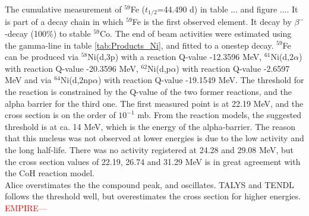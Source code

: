 \documentclass[a4paper,11pt,twoside]{book}
\begin{document}
\subsubsection{}
The cumulative measurement of $^{59}$Fe ($t_{1/2}$=44.490 d) \cite{Basunia2018} in table ... and figure .... It is part of a decay chain in which $^{59}$Fe is the first observed element. It decay by $\beta^-$-decay (100\%) to stable $^{59}$Co. The end of beam activities were estimated using the gamma-line in table \ref{tab:Products_Ni}, and fitted to a onestep decay. $^{59}$Fe can be produced via $^{58}$Ni(d,3p) with a reaction Q-value -12.3596 MeV, $^{61}$Ni(d,2$\alpha$) with reaction Q-value -20.3596 MeV, $^{62}$Ni(d,p$\alpha$) with reaction Q-value  -2.6597 MeV and via $^{64}$Ni(d,2np$\alpha$) with reaction Q-value -19.1549 MeV. The threshold for the reaction is constrained by the Q-value of the two former reactions, and the alpha barrier for the third one. The first measured point is at 22.19 MeV, and the cross section is on the order of $10^{-1}$ mb. From the reaction models, the suggested threshold is at ca. 14 MeV, which is the energy of the alpha-barrier. The reason that this nucleus was not observed at lower energies is due to the low activity and the long half-life. There was no activity registered at 24.28 and 29.08 MeV, but the cross section values of 22.19, 26.74 and 31.29 MeV is in great agreement with the CoH reaction model. \\
\noindent 
Alice overstimates the the compound peak, and oscillates. TALYS and TENDL follows the threshold well, but overestimates the cross section for higher energies. \textcolor{red}{EMPIRE---}
\end{document}
